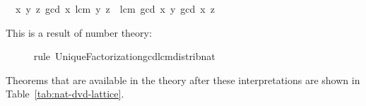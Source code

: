 \begin{isabellebody}
\begin{isamarkuptxt}
\normalsize \begin{isabelle}%
\ {}{\isachardot}\ {\isasymAnd}x\ y\ z{\isachardot}\ gcd\ x\ {\isacharparenleft}lcm\ y\ z{\isacharparenright}\ {\isacharequal}\ lcm\ {\isacharparenleft}gcd\ x\ y{\isacharparenright}\ {\isacharparenleft}gcd\ x\ z{\isacharparenright}%
\end{isabelle}
      This is a result of number theory:%
\end{isamarkuptxt}%
\isamarkuptrue%
\ \ \ \ \isamarkupfalse%
\ {\isacharparenleft}rule\ UniqueFactorization{\isachardot}gcd{\isacharunderscore}lcm{\isacharunderscore}distrib{\isacharunderscore}nat{\isacharparenright}%
\endisatagvisible
{\isafoldvisible}%
%
\isadelimvisible
%
\endisadelimvisible
%
\begin{isamarkuptext}%
Theorems that are available in the theory after these
  interpretations are shown in Table~\ref{tab:nat-dvd-lattice}.


\end{isamarkuptext}
\end{isabellebody}
